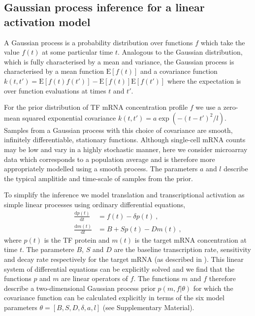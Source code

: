 \documentclass{pnastwo}
\begin{document}
\begin{article}
\section{Gaussian process inference for a linear activation model}

A Gaussian process is a probability distribution over
functions $f$ which take the value $f(t)$ at some particular time
$t$. Analogous to the Gaussian distribution, which is fully characterised by a mean and variance, the Gaussian process is
characterised by a mean function $\mathrm{E}[f(t)]$ and a covariance
function $k(t,t')=\mathrm{E}[f(t)f(t')]-\mathrm{E}[f(t)]\mathrm{E}[f(t')]$
where the expectation is over function evaluations at times $t$ and
$t'$. 

For the prior distribution of TF mRNA concentration profile $f$ we use a zero-mean squared exponential covariance
$k(t,t')=a\exp(-(t-t')^2/l)$. Samples from a Gaussian process with this choice
of covariance are smooth, infinitely differentiable, stationary functions. Although single-cell mRNA counts may be low
and vary in a highly stochastic manner, here we consider microarray data which
corresponds to a population average and is therefore more
appropriately modelled using a smooth process. The parameters $a$ and
$l$ describe the typical amplitide and time-scale of samples from
the prior. 

To simplify the inference we model translation and transcriptional
activation as simple linear processes using ordinary differential
equations,
\begin{align}
  \frac{\mathrm{d}p(t)}{\mathrm{d}t} & = f(t) - \delta
  p(t) \ , \label{eq:translation_ode} \\
  \frac{\mathrm{d}m(t)}{\mathrm{d}t} & = B+Sp(t)-Dm(t) \ , \label{eq:transcription_ode}
\end{align}
where $p(t)$ is the TF protein and $m(t)$ is the target mRNA
concentration at time $t$. The parametere $B$, $S$ and $D$ are the
baseline transcription rate, sensitivity and decay rate respectively
for the target mRNA (as described in \cite{Barenco2006a}). This linear system of differential equations can be
explicitly solved and we find that the functions $p$ and $m$ are
linear operators of $f$. The functions $m$ and $f$ therefore
describe a two-dimensional Gaussian process prior $p(m,f|\theta)$
for which the covariance function can be calculated explicitly in terms of the
six model parameters $\theta=[B,S,D,\delta,a,l]$ (see
Supplementary Material). 


\end{article}
\end{document}
